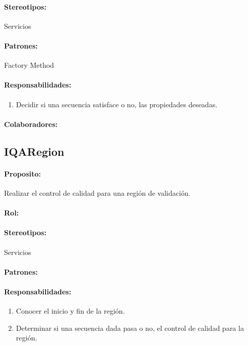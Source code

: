 \documentclass[a4paper,10pt]{article}
\begin{document}
    \paragraph{Stereotipos:} Servicios
    \paragraph{Patrones:} Factory Method
    \paragraph{Responsabilidades:}
      \begin{enumerate}
       \item Decidir si una secuencia satisface o no, las propiedades deseadas.
      \end{enumerate}
    \paragraph{Colaboradores:}

  \subsection{IQARegion}
    \paragraph{Proposito:} Realizar el control de calidad para una regi\'on de
validaci\'on.
    \paragraph{Rol:}
    \paragraph{Stereotipos:} Servicios
    \paragraph{Patrones:}
    \paragraph{Responsabilidades:}
      \begin{enumerate}
       \item Conocer el inicio y fin de la regi\'on.
       \item Determinar si una secuencia dada pasa o no, el control de calidad
para la regi\'on.
      \end{enumerate}
\end{document}
